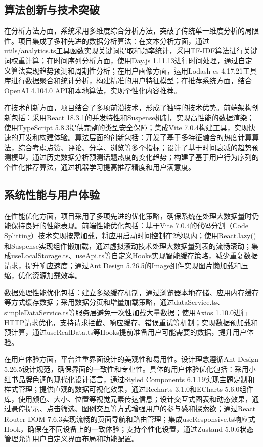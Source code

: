 \documentclass[12pt,a4paper]{article}
\begin{document}
\subsection{算法创新与技术突破}

在分析方法方面，系统采用多维度综合分析方法，突破了传统单一维度分析的局限性。项目集成了多种先进的数据分析算法：在文本分析方面，通过utils/analytics.ts工具函数实现关键词提取和频率统计，采用TF-IDF算法进行关键词权重计算；在时间序列分析方面，使用Day.js 1.11.13进行时间处理，通过自定义算法实现趋势预测和周期性分析；在用户画像方面，运用Lodash-es 4.17.21工具库进行数据聚合和统计分析，构建精准的用户特征模型；在推荐系统方面，结合OpenAI 4.104.0 API和本地算法，实现个性化内容推荐。

在技术创新方面，项目结合了多项前沿技术，形成了独特的技术优势。前端架构创新包括：采用React 18.3.1的并发特性和Suspense机制，实现高性能的数据渲染；使用TypeScript 5.8.3提供完整的类型安全保障；集成Vite 7.0.4构建工具，实现快速的开发和构建体验。算法层面的创新包括：开发了基于多特征融合的热度计算算法，综合考虑点赞、评论、分享、浏览等多个指标；设计了基于时间衰减的趋势预测模型，通过历史数据分析预测话题热度的变化趋势；构建了基于用户行为序列的个性化推荐算法，通过机器学习提高推荐精度和用户满意度。

\subsection{系统性能与用户体验}

在性能优化方面，项目采用了多项先进的优化策略，确保系统在处理大数据量时仍能保持良好的性能表现。前端性能优化包括：基于Vite 7.0.4的代码分割（Code Splitting）技术实现按需加载，将应用启动时间控制在2秒以内；使用React.lazy()和Suspense实现组件懒加载，通过虚拟滚动技术处理大数据量列表的流畅滚动；集成useLocalStorage.ts、useApi.ts等自定义Hooks实现智能缓存策略，减少重复数据请求，提升响应速度；通过Ant Design 5.26.5的Image组件实现图片懒加载和压缩，优化资源加载效率。

数据处理性能优化包括：建立多级缓存机制，通过浏览器本地存储、应用内存缓存等方式缓存数据；采用数据分页和增量加载策略，通过dataService.ts、simpleDataService.ts等服务层避免一次性加载大量数据；使用Axios 1.10.0进行HTTP请求优化，支持请求拦截、响应缓存、错误重试等机制；实现数据预加载和预计算，通过useRealData.ts等Hooks提前准备用户可能需要的数据，提升用户体验。

在用户体验方面，平台注重界面设计的美观性和易用性。设计理念遵循Ant Design 5.26.5设计规范，确保界面的一致性和专业性。具体的用户体验优化包括：采用小红书品牌色调的现代化设计语言，通过Styled Components 6.1.19实现主题定制和样式管理；提供直观的数据可视化效果，通过Recharts 3.1.0和ECharts 5.6.0组件库，使用颜色、大小、位置等视觉元素传达信息；设计交互式图表和动态效果，通过悬停提示、点击筛选、图例交互等方式增强用户的参与感和探索欲；通过React Router DOM 7.6.3实现流畅的页面导航和路由管理；集成useResponsive.ts响应式Hook，确保在不同设备上的一致体验；支持个性化设置，通过Zustand 5.0.6状态管理允许用户自定义界面布局和功能配置。
\end{document}
